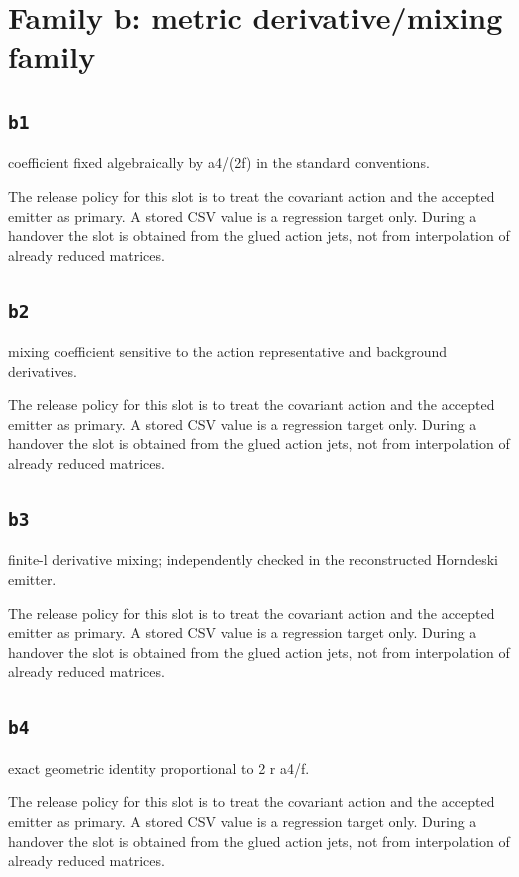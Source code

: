 \documentclass[11pt,a4paper,oneside]{book}
\begin{document}
\section{Family b: metric derivative/mixing family}
\subsection{\texttt{b1}}
coefficient fixed algebraically by a4/(2f) in the standard conventions.

The release policy for this slot is to treat the covariant action and the accepted emitter as primary. A stored CSV value is a regression target only. During a handover the slot is obtained from the glued action jets, not from interpolation of already reduced matrices.\par

\subsection{\texttt{b2}}
mixing coefficient sensitive to the action representative and background derivatives.

The release policy for this slot is to treat the covariant action and the accepted emitter as primary. A stored CSV value is a regression target only. During a handover the slot is obtained from the glued action jets, not from interpolation of already reduced matrices.\par

\subsection{\texttt{b3}}
finite-l derivative mixing; independently checked in the reconstructed Horndeski emitter.

The release policy for this slot is to treat the covariant action and the accepted emitter as primary. A stored CSV value is a regression target only. During a handover the slot is obtained from the glued action jets, not from interpolation of already reduced matrices.\par

\subsection{\texttt{b4}}
exact geometric identity proportional to 2 r a4/f.

The release policy for this slot is to treat the covariant action and the accepted emitter as primary. A stored CSV value is a regression target only. During a handover the slot is obtained from the glued action jets, not from interpolation of already reduced matrices.\par
\end{document}
